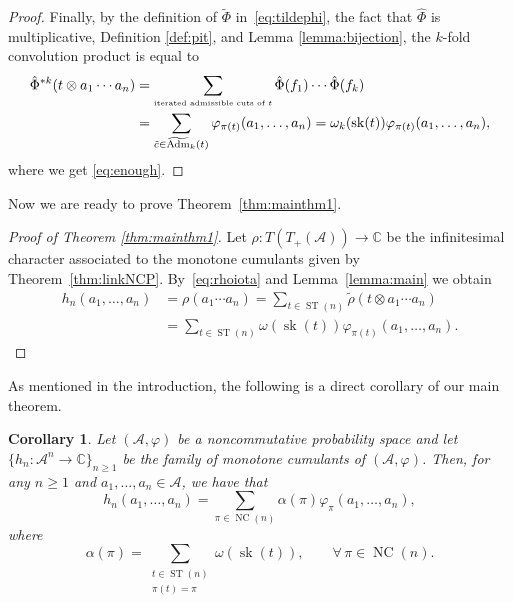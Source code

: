 \documentclass[pdftex]{sigma}%
\numberwithin{equation}{section}
\newtheorem{Corollary}[Theorem]{Corollary}
\newcommand{\A}{\mathcal{A}}
\newcommand{\NC}{\operatorname{NC}}
\newcommand{\ST}{\operatorname{ST}}
\newcommand{\sk}{\operatorname{sk}}
\newcommand{\AdmT}{\widetilde{\operatorname{Adm}}}
\begin{document}
\begin{proof}
Finally, by the definition of $\tilde\Phi$ in~\eqref{eq:tildephi}, the fact that $\hat\Phi$ is multiplicative, Definition \ref{def:pit}, and Lemma \ref{lemma:bijection}, the $k$-fold convolution product is equal to
\begin{align*}
	\hat\Phi^{*k}(t\otimes a_1\cdots a_n)
	&= \sum_{\mbox{\tiny{iterated admissible cuts of $t$}}} \hat\Phi(f_1)\cdots \hat\Phi(f_k)\\
	&= \sum_{\tilde{c}\in \AdmT_k(t)} \varphi_{\pi(t)}(a_1,\dots,a_n)= \omega_k(\sk(t)) \varphi_{\pi(t)}(a_1,\dots,a_n),
\end{align*}
where we get \eqref{eq:enough}.
\end{proof}

Now we are ready to prove Theorem~\ref{thm:mainthm1}.

\begin{proof}[Proof of Theorem \ref{thm:mainthm1}]
Let $\rho\colon T(T_+(\A))\to\mathbb{C}$ be the infinitesimal character associated to the monotone cumulants given by Theorem~\ref{thm:linkNCP}. By~\eqref{eq:rhoiota} and Lemma~\ref{lemma:main} we obtain
\begin{align*}
h_n(a_1,\dots,a_n) &= \rho(a_1\cdots a_n)
= \sum_{t\in \ST(n)} \tilde\rho(t\otimes a_1\cdots a_n)
\\ &= \sum_{t\in \ST(n)} \omega(\sk(t))\varphi_{\pi(t)} (a_1,\dots,a_n).\tag*{\qed}
\end{align*}\renewcommand{\qed}{}
\end{proof}

As mentioned in the introduction, the following is a direct corollary of our main theorem.

\begin{Corollary}
\label{cor:maincor}
Let $(\A,\varphi)$ be a noncommutative probability space and let $\{h_n\colon \A^n\to\mathbb{C}\}_{n\geq1}$ be the family of monotone cumulants of $(\A,\varphi)$. Then, for any $n\geq1$ and $a_1,\dots,a_n\in \A$, we have that
\[
	h_n(a_1,\dots,a_n) = \sum_{\pi\in\NC(n)} \alpha(\pi) \varphi_\pi(a_1,\dots,a_n),
\]
where
\[
	\alpha(\pi)
	= \sum_{\substack{t\in \ST(n)\\ \pi(t)
	= \pi}} \omega(\sk(t)),\qquad\forall\,\pi\in\NC(n).
\]
\end{Corollary}

\end{document}
